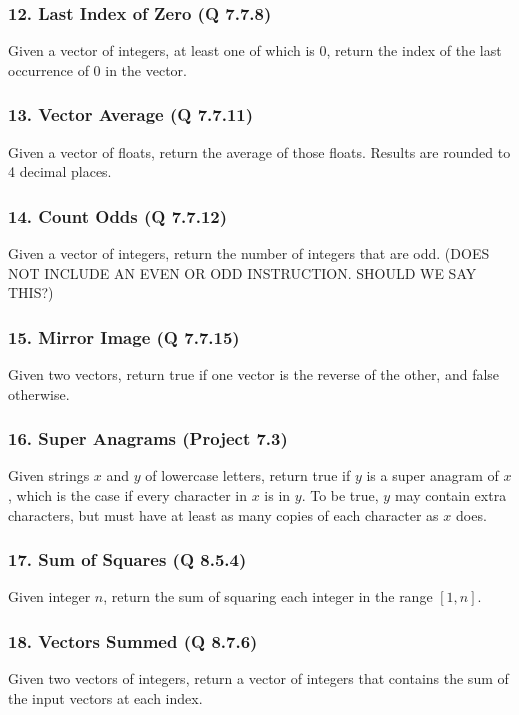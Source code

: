 \documentclass{sig-alternate}
\begin{document}
\subsubsection*{12. Last Index of Zero (Q 7.7.8)}
Given a vector of integers, at least one of which is 0, return the index of the last occurrence of 0 in the vector.

\subsubsection*{13. Vector Average (Q 7.7.11)}
Given a vector of floats, return the average of those floats. Results are rounded to 4 decimal places.

\subsubsection*{14. Count Odds (Q 7.7.12)}
Given a vector of integers, return the number of integers that are odd. (DOES NOT INCLUDE AN EVEN OR ODD INSTRUCTION. SHOULD WE SAY THIS?)

\subsubsection*{15. Mirror Image (Q 7.7.15)}
Given two vectors, return true if one vector is the reverse of the other, and false otherwise.

\subsubsection*{16. Super Anagrams (Project 7.3)}
Given strings $x$ and $y$ of lowercase letters, return true if $y$ is a super anagram of $x$, which is the case if every character in $x$ is in $y$. To be true, $y$ may contain extra characters, but must have at least as many copies of each character as $x$ does.

\subsubsection*{17. Sum of Squares (Q 8.5.4)}
Given integer $n$, return the sum of squaring each integer in the range $[1, n]$.

\subsubsection*{18. Vectors Summed (Q 8.7.6)}
Given two vectors of integers, return a vector of integers that contains the sum of the input vectors at each index.
\end{document}
